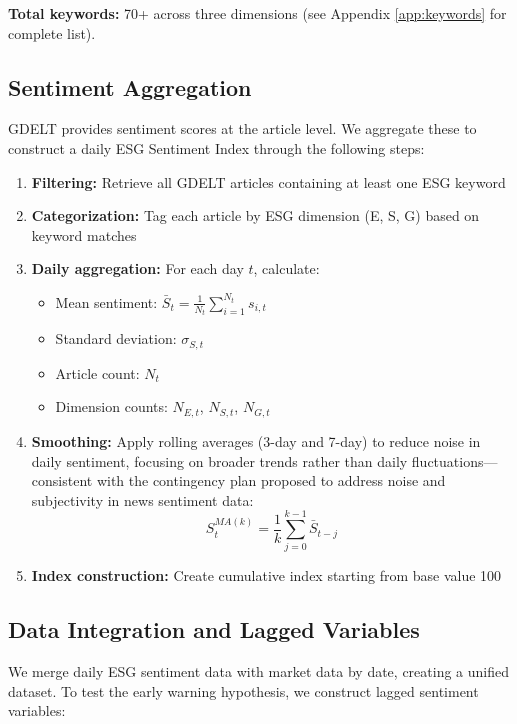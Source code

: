 \documentclass[12pt,a4paper]{article}
\begin{document}
\textbf{Total keywords:} 70+ across three dimensions (see Appendix \ref{app:keywords} for complete list).

\subsection{Sentiment Aggregation}
\label{subsec:aggregation}

GDELT provides sentiment scores at the article level. We aggregate these to construct a daily ESG Sentiment Index through the following steps:

\begin{enumerate}[itemsep=0.5em]
    \item \textbf{Filtering:} Retrieve all GDELT articles containing at least one ESG keyword
    \item \textbf{Categorization:} Tag each article by ESG dimension (E, S, G) based on keyword matches
    \item \textbf{Daily aggregation:} For each day $t$, calculate:
    \begin{itemize}
        \item Mean sentiment: $\bar{S}_t = \frac{1}{N_t} \sum_{i=1}^{N_t} s_{i,t}$
        \item Standard deviation: $\sigma_{S,t}$
        \item Article count: $N_t$
        \item Dimension counts: $N_{E,t}$, $N_{S,t}$, $N_{G,t}$
    \end{itemize}
    \item \textbf{Smoothing:} Apply rolling averages (3-day and 7-day) to reduce noise in daily sentiment, focusing on broader trends rather than daily fluctuations---consistent with the contingency plan proposed to address noise and subjectivity in news sentiment data:
    $$S_{t}^{MA(k)} = \frac{1}{k} \sum_{j=0}^{k-1} \bar{S}_{t-j}$$
    \item \textbf{Index construction:} Create cumulative index starting from base value 100
\end{enumerate}

\subsection{Data Integration and Lagged Variables}
\label{subsec:integration}

We merge daily ESG sentiment data with market data by date, creating a unified dataset. To test the early warning hypothesis, we construct lagged sentiment variables:
\end{document}
